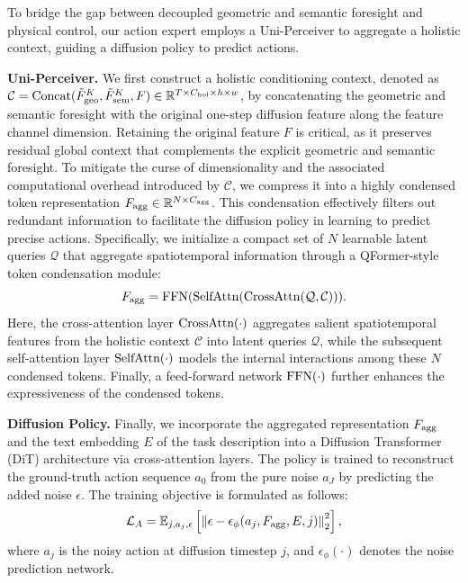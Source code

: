 
\label{sec:ae}
To bridge the gap between decoupled geometric and semantic foresight and physical control, our action expert employs a Uni-Perceiver to aggregate a holistic context, guiding a diffusion policy to predict actions.

\noindent \textbf{Uni-Perceiver.}
We first construct a holistic conditioning context, denoted as $\mathcal{C}=\textnormal{Concat}(\tilde{F}^{K}_\textnormal{geo}, \tilde{F}^{K}_\textnormal{sem}, F)\in\mathbb{R}^{T\times C_{\textnormal{hol}} \times h \times w}$, by concatenating the geometric and semantic foresight with the original one-step diffusion feature along the feature channel dimension. Retaining the original feature $F$ is critical, as it preserves residual global context that complements the explicit geometric and semantic foresight.
To mitigate the curse of dimensionality and the associated computational overhead introduced by $\mathcal{C}$, we compress it into a highly condensed token representation $F_\textnormal{agg} \in \mathbb{R}^{N \times C_\textnormal{agg}}$. This condensation effectively filters out redundant information to facilitate the diffusion policy in learning to predict precise actions. Specifically, we initialize a compact set of $N$ learnable latent queries $\mathcal{Q}$ that aggregate spatiotemporal information through a QFormer-style~\cite{li2023blip,jaegle2022perceiver} token condensation module:
\begin{equation}
    F_\textnormal{agg} = \text{FFN}(\text{SelfAttn}(\text{CrossAttn}(\mathcal{Q}, \mathcal{C}))).
    \label{eq:aggregation}
\end{equation}
Here, the cross-attention layer $\textnormal{CrossAttn}(\cdot)$ aggregates salient spatiotemporal features from the holistic context $\mathcal{C}$ into latent queries $\mathcal{Q}$, while the subsequent self-attention layer $\textnormal{SelfAttn}(\cdot)$ models the internal interactions among these $N$ condensed tokens. Finally, a feed-forward network $\textnormal{FFN}(\cdot)$ further enhances the expressiveness of the condensed tokens.


\noindent \textbf{Diffusion Policy.}
Finally, we incorporate the aggregated representation $F_\textnormal{agg}$ and the text embedding $E$ of the task description into a Diffusion Transformer (DiT) architecture via cross-attention layers. The policy is trained to reconstruct the ground-truth action sequence $a_0$ from the pure noise $a_J$ by predicting the added noise $\epsilon$. The training objective is formulated as follows:
\begin{equation}
    \mathcal{L}_A = \mathbb{E}_{j, a_j, \epsilon} \left[ \left\| \epsilon - \epsilon_\phi(a_j, F_\textnormal{agg}, E, j) \right\|_2^2 \right],
\end{equation}
where $a_j$ is the noisy action at diffusion timestep $j$, and $\epsilon_\phi(\cdot)$ denotes the noise prediction network.






